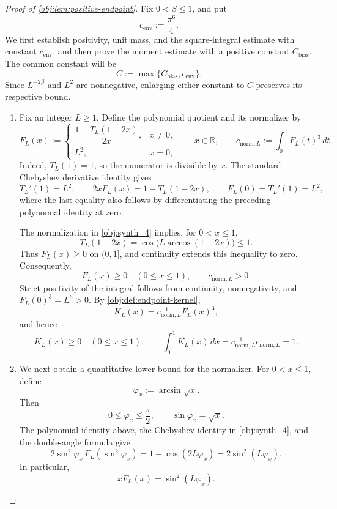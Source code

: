 \begin{proof}[Proof of \cref{obj:lem:positive-endpoint}]
Fix \(0<\beta\le1\), and put
\[
c_{\mathrm{env}}:=\frac{\pi^6}{4}.
\]
We first establish positivity, unit mass, and the square-integral estimate with constant \(c_{\mathrm{env}}\), and then prove the moment estimate with a positive constant \(C_{\mathrm{bias}}\). The common constant will be
\[
C:=\max\{C_{\mathrm{bias}},c_{\mathrm{env}}\}.
\]
Since \(L^{-2\beta}\) and \(L^2\) are nonnegative, enlarging either constant to \(C\) preserves its respective bound.

\begin{enumerate}
\item Fix an integer \(L\ge1\). Define the polynomial quotient and its normalizer by
\[
F_L(x):=
\begin{cases}
\dfrac{1-T_L(1-2x)}{2x},&x\ne0,\\[6pt]
L^2,&x=0,
\end{cases}
\qquad x\in\mathbb R,
\qquad
c_{\mathrm{norm},L}:=\int_0^1 F_L(t)^3\,dt.
\]
Indeed, \(T_L(1)=1\), so the numerator is divisible by \(x\). The standard Chebyshev derivative identity gives
\[
T_L'(1)=L^2,
\qquad
2xF_L(x)=1-T_L(1-2x),
\qquad
F_L(0)=T_L'(1)=L^2,
\]
where the last equality also follows by differentiating the preceding polynomial identity at zero.

The normalization in \cref{obj:synth_4} implies, for \(0<x\le1\),
\[
T_L(1-2x)
=
\cos\!\bigl(L\arccos(1-2x)\bigr)
\le1.
\]
Thus \(F_L(x)\ge0\) on \((0,1]\), and continuity extends this inequality to zero. Consequently,
\[
F_L(x)\ge0\quad(0\le x\le1),
\qquad
c_{\mathrm{norm},L}>0.
\]
Strict positivity of the integral follows from continuity, nonnegativity, and \(F_L(0)^3=L^6>0\). By \cref{obj:def:endpoint-kernel},
\[
K_L(x)=c_{\mathrm{norm},L}^{-1}F_L(x)^3,
\]
and hence
\[
K_L(x)\ge0\quad(0\le x\le1),
\qquad
\int_0^1K_L(x)\,dx
=
c_{\mathrm{norm},L}^{-1}c_{\mathrm{norm},L}
=1.
\]

\item We next obtain a quantitative lower bound for the normalizer. For \(0<x\le1\), define
\[
\varphi_x:=\arcsin\sqrt{x}.
\]
Then
\[
0\le\varphi_x\le\frac{\pi}{2},
\qquad
\sin\varphi_x=\sqrt{x}.
\]
The polynomial identity above, the Chebyshev identity in \cref{obj:synth_4}, and the double-angle formula give
\[
2\sin^2\varphi_x\,F_L(\sin^2\varphi_x)
=
1-\cos(2L\varphi_x)
=
2\sin^2(L\varphi_x).
\]
In particular,
\[
xF_L(x)=\sin^2(L\varphi_x).
\]


\end{enumerate}
\end{proof}
